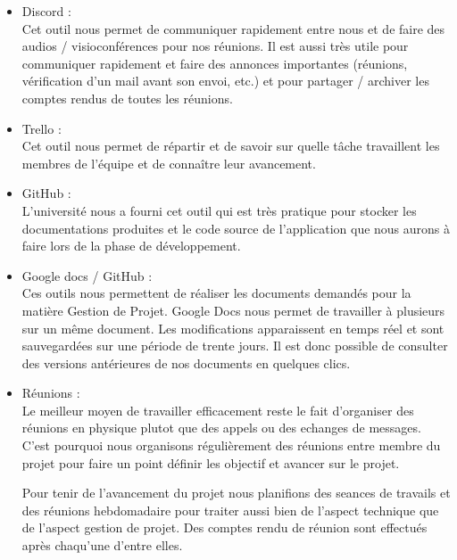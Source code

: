 \begin{itemize}
	\item Discord :\\
	Cet outil nous permet de communiquer rapidement entre nous et
de faire des audios / visioconférences pour nos réunions. Il est aussi très utile
pour communiquer rapidement et faire des annonces importantes (réunions,
vérification d’un mail avant son envoi, etc.) et pour partager / archiver les
comptes rendus de toutes les réunions.\\
	\item Trello :\\
	Cet outil nous permet de répartir et de savoir sur quelle tâche
travaillent les membres de l’équipe et de connaître leur avancement.\\
	\item GitHub :\\
	L’université nous a fourni cet outil qui est très pratique pour stocker
les documentations produites et le code source de l’application que nous
aurons à faire lors de la phase de développement.\\
	\item Google docs / GitHub :\\
	Ces outils nous permettent de réaliser les documents demandés
pour la matière Gestion de Projet. Google Docs nous permet de travailler à
plusieurs sur un même document. Les modifications apparaissent en temps
réel et sont sauvegardées sur une période de trente jours. Il est donc possible
de consulter des versions antérieures de nos documents en quelques clics.\\
	\item Réunions :\\
	Le meilleur moyen de travailler efficacement reste le fait d'organiser des réunions en physique 
	plutot que des appels ou des echanges de messages. C'est pourquoi nous organisons régulièrement des réunions
	entre membre du projet pour faire un point définir les objectif et avancer sur le projet. \newline

Pour tenir de l'avancement du projet nous planifions des seances de travails et des réunions hebdomadaire pour traiter
aussi bien de l'aspect technique que de l'aspect gestion de projet. Des comptes rendu de réunion sont effectués après chaqu'une d'entre elles.
\end{itemize}
